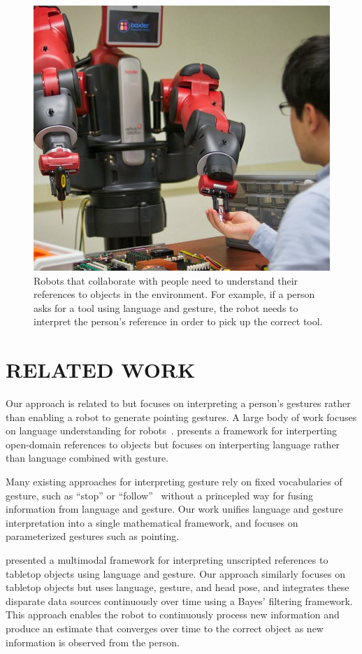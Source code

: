 \documentclass[letterpaper, 10 pt, conference]{ieeeconf}
\begin{document}
\begin{figure}
\centering
\includegraphics[width=0.5\linewidth]{figures/baxter_scene_cropped.jpg}
\caption{Robots that collaborate with people need to understand their
  references to objects in the environment.  For example, if a person
  asks for a tool using language and gesture, the robot needs to
  interpret the person's reference in order to pick up the correct
  tool.\label{fig:example}}
\end{figure}

\section{RELATED WORK}

Our approach is related to \citet{holladay14} but focuses on
interpreting a person's gestures rather than enabling a robot to
generate pointing gestures.  A large body of work focuses on language
understanding for robots~\citep{macmahon06, dzifcak09, kollar10,
  matuszek12}.  \citet{guadarrama14} presents a framework for
interperting open-domain references to objects but focuses on
interperting language rather than language combined with gesture.

Many existing approaches for interpreting gesture rely on fixed
vocabularies of gesture, such as ``stop'' or
``follow''~\citep{waldherr00, marge11} without a princepled way for
fusing information from language and gesture.  Our work unifies
language and gesture interpretation into a single mathematical
framework, and focuses on parameterized gestures such as pointing.


\citet{matuszek14} presented a multimodal framework for interpreting
unscripted references to tabletop objects using language and gesture.
Our approach similarly focuses on tabletop objects but uses language,
gesture, and head pose, and integrates these disparate data sources
continuously over time using a Bayes' filtering framework.  This
approach enables the robot to continuously process new information and
produce an estimate that converges over time to the correct object as
new information is observed from the person.  
\end{document}
